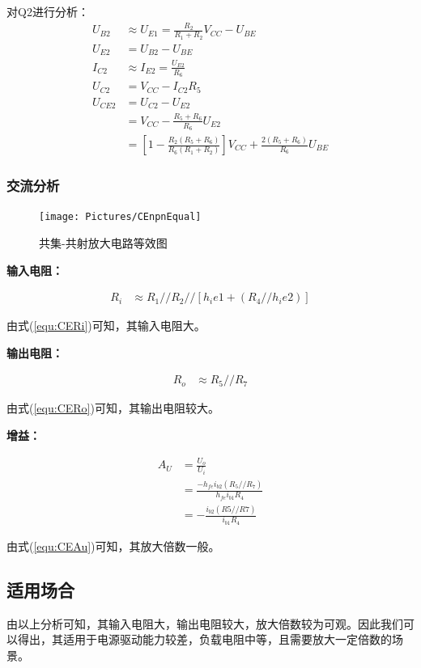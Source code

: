 \documentclass[11pt,a4paper,UTF8]{ctexart}
\begin{document}
				对Q2进行分析：
				\begin{align}
					U_{B2} &\approx U_{E1} = \frac{R_2}{R_1+R_2}V_{CC} - U_{BE} \\
					U_{E2} &= U_{B2} - U_{BE} \\
					I_{C2} &\approx I_{E2} = \frac{U_{E2}}{R_6} \\
					U_{C2} &= V_{CC} - I_{C2}R_5 \\
					U_{CE2} &= U_{C2} - U_{E2} \nonumber\\
					&= V_{CC} - \frac{R_5+R_6}{R_6}U_{E2} \nonumber\\
					&= [1-\frac{R_2(R_5+R_6)}{R_6(R_1+R_2)}]V_{CC} + \frac{2(R_5+R_6)}{R_6}U_{BE}
				\end{align}
			\subsubsection{交流分析}
				\begin{figure}[H]
					\centering
					\texttt{[image: Pictures/CEnpnEqual]}
					\caption{共集-共射放大电路等效图}
					\label{fig:cenpnequal}
				\end{figure}
			
			\textbf{输入电阻：}
			
			\begin{align}
				R_i &\approx R_1//R_2//[h_ie1+(R_4//h_ie2)] \label{equ:CERi}
			\end{align}
			
			由式(\ref{equ:CERi})可知，其输入电阻大。
			
			\textbf{输出电阻：}
			
			\begin{align}
				R_o &\approx R_5//R_7 \label{equ:CERo}
			\end{align}
			
			由式(\ref{equ:CERo})可知，其输出电阻较大。
			
			\textbf{增益：}
			
			\begin{align}
				A_U &= \frac{U_o}{U_i} \nonumber\\
				&= \frac{-h_{fe}i_{b2}(R_5//R_7)}{h_{fe}i_{b1}R_4} \nonumber\\
				&= -\frac{i_{b2}(R5//R7)}{i_{b1}R_4} \label{equ:CEAu}
			\end{align}
				
			由式(\ref{equ:CEAu})可知，其放大倍数一般。
		\subsection{适用场合}
			由以上分析可知，其输入电阻大，输出电阻较大，放大倍数较为可观。因此我们可以得出，其适用于电源驱动能力较差，负载电阻中等，且需要放大一定倍数的场景。
\end{document}
